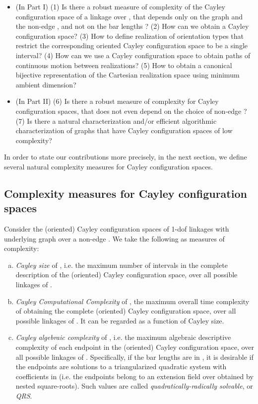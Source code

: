 \documentclass[secthm,amsthm,english]{article}
\theoremstyle{definition}
\theoremstyle{remark}
\begin{document}
\begin{itemize}

	\item (In Part I)
	(1) Is there a robust measure of complexity of the Cayley configuration space of a linkage  over ,
	 that depends only on the graph  and the non-edge , and not on the bar lengths ? 	
	(2) How can we obtain a Cayley configuration space? 
	(3) How to define realization of orientation types 
	that restrict the corresponding oriented Cayley configuration space to be a single interval?
(4) How can we use a Cayley configuration space to obtain paths of continuous motion between realizations? 
	(5) How to obtain a canonical bijective representation of the Cartesian realization space using minimum ambient dimension?
	
	\item (In Part II) 
	(6) Is there a robust measure of complexity for Cayley configuration spaces,
	that does not even depend on the choice of non-edge ?
	(7) Is there a natural characterization and/or efficient algorithmic characterization 
	of graphs  that have Cayley configuration spaces of low complexity?

\end{itemize}

\noindent In order to state our contributions more precisely, in the next section, we define several natural complexity measures for Cayley configuration spaces.
\subsection{Complexity measures for Cayley configuration spaces}


Consider the (oriented) Cayley configuration spaces of 1-dof linkages with underlying graph  over a non-edge . 
We take the following as measures of complexity:

\begin{enumerate}[(a)]
	\item \emph{Cayley size} of , i.e. the maximum number of intervals in the complete description of the (oriented) Cayley configuration space, 
			over all possible linkages  of . 
	
	\item \emph{Cayley Computational Complexity} of , the maximum overall time complexity of obtaining the complete  (oriented) Cayley configuration space, 
			over all possible linkages  of . 
			It can be regarded as a function of Cayley size.

	\item \emph{Cayley algebraic complexity} of , i.e. the maximum algebraic descriptive complexity of each endpoint in the  (oriented) Cayley configuration space,  
			over all possible linkages  of . 
			Specifically, if the bar lengths  are in , 
			it is desirable if the endpoints are solutions to a triangularized quadratic system with coefficients in  
			(i.e. the endpoints belong to an extension field over  obtained by nested square-roots). 
			Such values are called \emph{quadratically-radically solvable}, or \emph{QRS}.
\end{enumerate}
\end{document}
